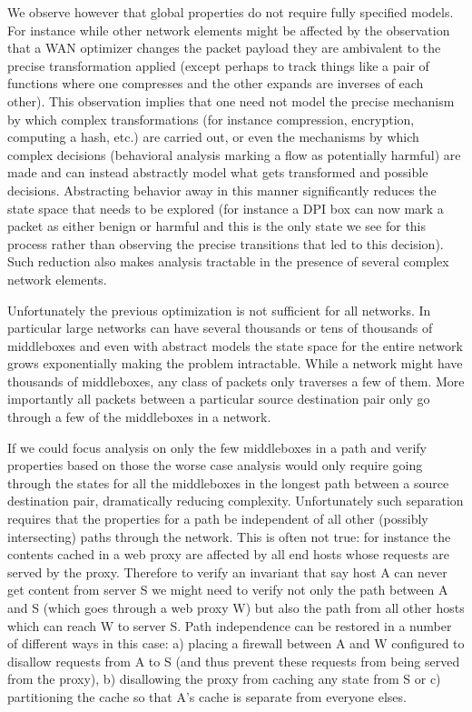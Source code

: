 \documentclass[letterpaper]{article}
\begin{document}
We observe however that global properties do not require fully specified models. For instance while other
network elements might be affected by the observation that a WAN optimizer changes the packet payload they are
ambivalent to the precise transformation applied (except perhaps to track things like a pair of functions
where one compresses and the other expands are inverses of each other). This observation implies that one need
not model the precise mechanism by which complex transformations (for instance compression, encryption,
computing a hash, etc.) are carried out, or even the mechanisms by which complex decisions (behavioral
analysis marking a flow as potentially harmful) are made and can instead abstractly model what gets
transformed and possible decisions. Abstracting behavior away in this manner significantly reduces the state
space that needs to be explored (for instance a DPI box can now mark a packet as either benign or harmful and
this is the only state we see for this process rather than observing the precise transitions that led to this
decision). Such reduction also makes analysis tractable in the presence of several complex network elements.

Unfortunately the previous optimization is not sufficient for all networks. In particular large networks can
have several thousands or tens of thousands of middleboxes and even with abstract models the state space for the
entire network grows exponentially making the problem intractable. While a network might have thousands of
middleboxes, any class of packets only traverses a few of them. More importantly all packets between a
particular source destination pair only go through a few of the middleboxes in a network. 

If we could focus analysis on only the few middleboxes in a path and verify properties based on those the
worse case analysis would only require going through the states for all the middleboxes in the longest path
between a source destination pair, dramatically reducing complexity. Unfortunately such separation requires
that the properties for a path be independent of all other (possibly intersecting) paths through the network.
This is often not true: for instance the contents cached in a web proxy are affected by all end hosts whose
requests are served by the proxy. Therefore to verify an invariant that say host A can never get content from
server S we might need to verify not only the path between A and S (which goes through a web proxy W) but also
the path from all other hosts which can reach W to server S. Path independence can be restored in a number of
different ways in this case: a) placing a firewall between A and W configured to disallow requests from A to S
(and thus prevent these requests from being served from the proxy), b) disallowing the proxy from caching any
state from S or c) partitioning the cache so that A's cache is separate from everyone elses. 
\end{document}
